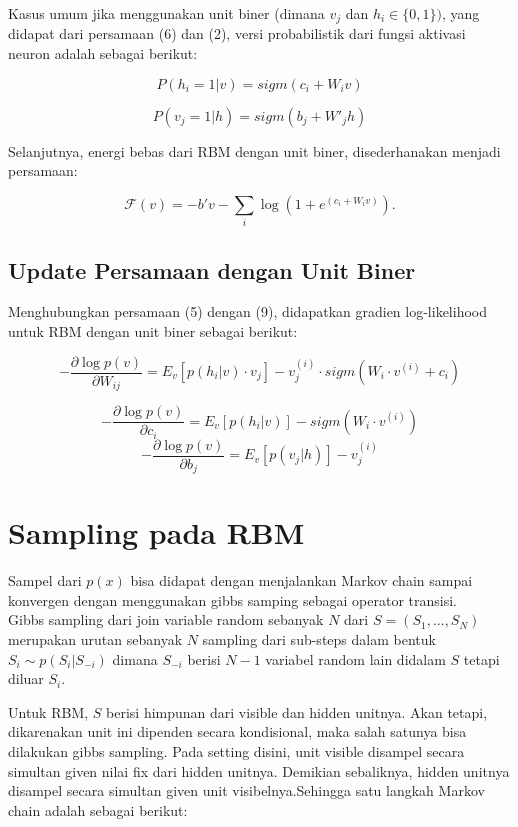 \documentclass[12pt]{article}
\begin{document}
Kasus umum jika menggunakan unit biner (dimana $v_j$ dan $h_i \in
\{0,1\})$, yang didapat dari persamaan (6) dan (2), versi probabilistik dari fungsi aktivasi neuron adalah sebagai berikut:

\begin{equation}
P(h_i=1|v) = sigm(c_i + W_i v)
\end{equation}

\begin{equation}
P(v_j=1|h) = sigm(b_j + W'_j h)
\end{equation}

Selanjutnya, energi bebas dari RBM dengan unit biner, disederhanakan menjadi persamaan:

\begin{equation}
\mathcal{F}(v)= - b'v - \sum_i \log(1 + e^{(c_i + W_i v)}).
\end{equation}

\subsection{Update Persamaan dengan Unit Biner}

Menghubungkan persamaan (5) dengan (9), didapatkan gradien log-likelihood untuk RBM dengan unit biner sebagai berikut:

\begin{equation}
- \frac{\partial{ \log p(v)}}{\partial W_{ij}} =
    E_v[p(h_i|v) \cdot v_j]
    - v^{(i)}_j \cdot sigm(W_i \cdot v^{(i)} + c_i)
\end{equation}

\[-\frac{\partial{ \log p(v)}}{\partial c_i} =
    E_v[p(h_i|v)] - sigm(W_i \cdot v^{(i)})\]
\[-\frac{\partial{ \log p(v)}}{\partial b_j} =
    E_v[p(v_j|h)] - v^{(i)}_j\]


\section{Sampling pada RBM}

Sampel dari $p(x)$ bisa didapat dengan menjalankan Markov chain sampai konvergen dengan menggunakan gibbs samping sebagai operator transisi. \\

Gibbs sampling dari join variable random sebanyak $N$ dari $S=(S_1, ... , S_N)$ merupakan urutan sebanyak $N$ sampling dari sub-steps dalam bentuk $S_i \sim p(S_i | S_{-i})$ dimana $S_{-i}$ berisi $N-1$ variabel random lain didalam $S$ tetapi diluar $S_i$.

Untuk RBM, $S$ berisi himpunan dari visible dan hidden unitnya. Akan tetapi, dikarenakan unit ini dipenden secara kondisional, maka salah satunya bisa dilakukan gibbs sampling. Pada setting disini, unit visible disampel secara simultan given nilai fix dari hidden unitnya. Demikian sebaliknya, hidden unitnya disampel secara simultan given unit visibelnya.Sehingga satu langkah Markov chain adalah sebagai berikut: 
\end{document}
